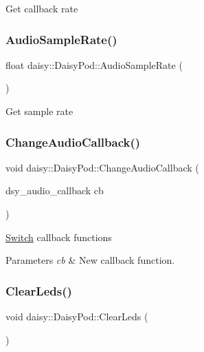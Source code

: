 Get callback rate \mbox{\label{classdaisy_1_1_daisy_pod_a228688fe03c569148141a8826fb20460}} 
\subsubsection{\texorpdfstring{Audio\+Sample\+Rate()}{AudioSampleRate()}}
{\footnotesize\ttfamily float daisy\+::\+Daisy\+Pod\+::\+Audio\+Sample\+Rate (\begin{DoxyParamCaption}{ }\end{DoxyParamCaption})}

Get sample rate \mbox{\label{classdaisy_1_1_daisy_pod_a65e2919087209592aa41260b4e91dc26}} 
\subsubsection{\texorpdfstring{Change\+Audio\+Callback()}{ChangeAudioCallback()}}
{\footnotesize\ttfamily void daisy\+::\+Daisy\+Pod\+::\+Change\+Audio\+Callback (\begin{DoxyParamCaption}\item[{dsy\+\_\+audio\+\_\+callback}]{cb }\end{DoxyParamCaption})}

\hyperlink{classdaisy_1_1_switch}{Switch} callback functions 
\begin{DoxyParams}{Parameters}
{\em cb} & New callback function. \\
\hline
\end{DoxyParams}
\mbox{\label{classdaisy_1_1_daisy_pod_a9bc2e391f7e1a29f04151f82003d88da}} 
\subsubsection{\texorpdfstring{Clear\+Leds()}{ClearLeds()}}
{\footnotesize\ttfamily void daisy\+::\+Daisy\+Pod\+::\+Clear\+Leds (\begin{DoxyParamCaption}{ }\end{DoxyParamCaption})}

